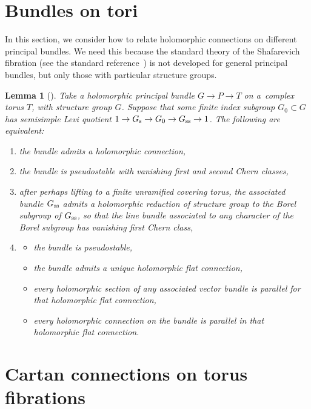 \documentclass[pdftex]{sigma}
\numberwithin{equation}{section}
\newtheorem{Lemma}[Theorem]{Lemma}
\begin{document}
\section{Bundles on tori}\label{section:bundles.on.tori}
In this section, we consider how to relate holomorphic connections on different principal bundles.
We need this because the standard theory of the Shafarevich fibration (see the standard reference~\cite{Zuo:1999}) is not developed for general principal bundles, but only those with particular structure groups.
\begin{Lemma}[{\cite[Theorem 4.1]{Biswas/Gomez:2008}}]\label{lemma:BG}
Take a holomorphic principal bundle $G \to P \to T$ on a~complex torus $T$, with structure group $G$.
Suppose that some finite index subgroup $G_0 \subset G$ has semisimple Levi quotient $1 \to G_{\rm s}
 \to G_0 \to G_{\rm ss} \to 1$.
The following are equivalent:
\begin{enumerate}\itemsep=0pt
\item[$(1)$]
the bundle admits a holomorphic connection,
\item[$(2)$]
the bundle is pseudostable with vanishing first and second Chern classes,
\item[$(3)$]
after perhaps lifting to a finite unramified covering torus, the associated bundle $G_{\rm ss}$ admits a holomorphic reduction of structure group to the Borel subgroup of $G_{\rm ss}$, so that the line bundle associated to any character of the Borel subgroup has vanishing first Chern class,
\item[$(4)$]
\begin{itemize}\itemsep=0pt
\item
the bundle is pseudostable,
\item
the bundle admits a unique holomorphic flat connection,
\item
every holomorphic section of any associated vector bundle is parallel for that holomorphic flat connection,
\item
every holomorphic connection on the bundle is parallel in that holomorphic flat connection.
\end{itemize}
\end{enumerate}
\end{Lemma}

\section{Cartan connections on torus fibrations}\label{section:Cartan.torus.fib}
\end{document}
